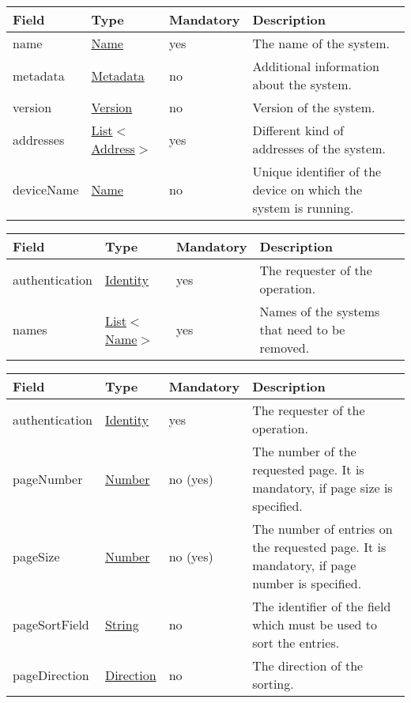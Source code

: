 \documentclass[a4paper]{arrowhead}
\newcommand{\pref}[1]{{\textcolor{ArrowheadGrey}{\hyperref[sec:model:primitives:#1]{#1}}}}
\begin{document}
\begin{table}[ht!]
\begin{tabularx}{\textwidth}{| p{2.5cm} | p{2.5cm} | p{2cm} | X |} \hline
\rowcolor{gray!33} Field & Type & Mandatory & Description \\ \hline
name & \pref{Name} & yes & The name of the system. \\ \hline
metadata &\hyperref[sec:model:Metadata]{Metadata} & no & Additional information about the system. \\ \hline
version &\pref{Version} & no & Version of the system. \\ \hline
addresses &  \pref{List}$<$\pref{Address}$>$ & yes & Different kind of addresses of the system.  \\ \hline
deviceName & \pref{Name} & no & Unique identifier of the device on which the system is running. \\ \hline
\end{tabularx}
\end{table}


\begin{table}[H]
\begin{tabularx}{\textwidth}{| p{2.5cm} | p{2.5cm} | p{2cm} | X |} \hline
\rowcolor{gray!33} Field & Type & Mandatory & Description \\ \hline
authentication & \hyperref[sec:model:Identity]{Identity} & yes & The requester of the operation. \\ \hline
names &  \pref{List}$<$\pref{Name}$>$ & yes & Names of the systems that need to be removed. \\ \hline
\end{tabularx}
\end{table}


\begin{table}[ht!]
\begin{tabularx}{\textwidth}{| p{2.5cm} | p{2.5cm} | p{2cm} | X |} \hline
\rowcolor{gray!33} Field & Type & Mandatory & Description \\ \hline
authentication & \hyperref[sec:model:Identity]{Identity} & yes & The requester of the operation. \\ \hline
pageNumber & \pref{Number} & no (yes) & The number of the requested page. It is mandatory, if page size is specified. \\ \hline
pageSize & \pref{Number} & no (yes) & The number of entries on the requested page. It is mandatory, if page number is specified. \\ \hline
pageSortField & \pref{String} & no & The identifier of the field which must be used to sort the entries. \\ \hline
pageDirection & \pref{Direction} & no & The direction of the sorting. \\ \hline
\end{tabularx}
\end{table}
\end{document}
